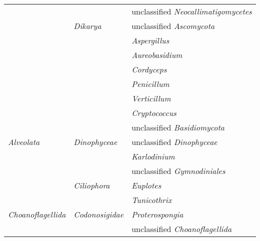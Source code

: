 \begin{longtable}{p{2.5cm}p{4cm}p{7cm}}
 &  & unclassified \emph{Neocallimatigomycetes} \\
 & \emph{Dikarya} & unclassified \emph{Ascomycota} \\
 &  & \emph{Aspergillus} \\
 &  & \emph{Aureobasidium} \\
 &  & \emph{Cordyceps} \\
 &  & \emph{Penicillum} \\
 &  & \emph{Verticillum} \\
 &  & \emph{Cryptococcus} \\
 &  & unclassified \emph{Basidiomycota} \\
\emph{Alveolata} & \emph{Dinophyceae} & unclassified \emph{Dinophyceae} \\
 &  & \emph{Karlodinium} \\
 &  & unclassified \emph{Gymnodiniales} \\
 & \emph{Ciliophora} & \emph{Euplotes} \\
 &  & \emph{Tunicothrix} \\
\emph{Choanoflagellida} & \emph{Codonosigidae} & \emph{Proterospongia} \\
 &  & unclassified \emph{Choanoflagellida} \\
\end{longtable}
\endgroup

